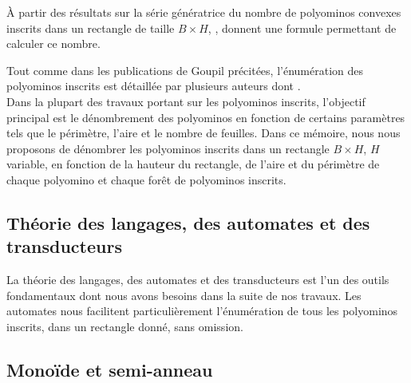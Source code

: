  À partir des résultats sur la série génératrice du nombre de polyominos convexes inscrits dans un rectangle de taille $B\times H$, \cite{Ch-Li}, \cite{Gess} donnent  une formule permettant de calculer ce nombre.
 
 Tout comme  dans les publications de Goupil précitées, l'énumération des polyominos inscrits est détaillée par plusieurs auteurs  dont \cite{Bos1}.\\

 Dans la plupart des travaux portant sur les polyominos inscrits, l'objectif principal est le dénombrement des polyominos en fonction de certains paramètres tels que le périmètre, l'aire et le nombre de feuilles. Dans ce mémoire, nous nous proposons de dénombrer les polyominos inscrits dans un rectangle $B \times H$, $H$ variable, en fonction de la hauteur du rectangle, de l'aire et du périmètre de chaque polyomino et chaque forêt de polyominos inscrits. 
 \begin{spacing}{0.30}
\section{Théorie des langages, des automates et des transducteurs}
\end{spacing}
La théorie des langages, des automates et des transducteurs  est l'un des outils fondamentaux dont nous avons besoins dans la suite de nos travaux. Les automates nous facilitent particulièrement l'énumération de tous les polyominos inscrits, dans un rectangle donné, sans omission.
\begin{spacing}{0.30}
\subsection{Monoïde et semi-anneau }\label{defaut1}
\end{spacing}
